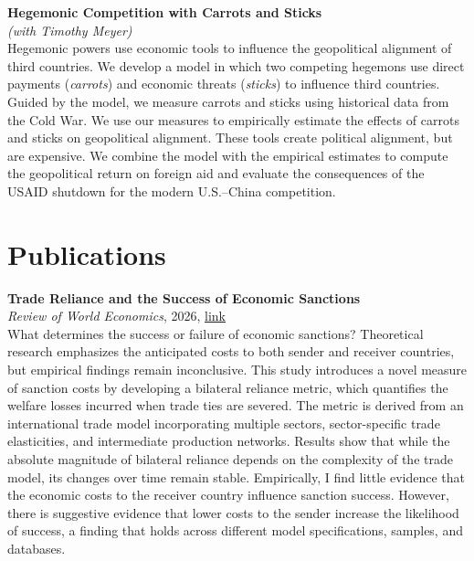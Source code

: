 \documentclass[11pt]{article}
\begin{document}
\bigskip
\noindent
\textbf{Hegemonic Competition with Carrots and Sticks} \\
\emph{(with Timothy Meyer)} \\
{\small Hegemonic powers use economic tools to influence the geopolitical alignment of third countries. We develop a model in which two competing hegemons use direct payments (\emph{carrots}) and economic threats (\emph{sticks}) to influence third countries. Guided by the model, we measure carrots and sticks using historical data from the Cold War. We use our measures to empirically estimate the effects of carrots and sticks on geopolitical alignment. These tools create political alignment, but are expensive. We combine the model with the empirical estimates to compute the geopolitical return on foreign aid and evaluate the consequences of the USAID shutdown for the modern U.S.--China competition.}

\section*{Publications}
\textbf{Trade Reliance and the Success of Economic Sanctions}  \\
\emph{Review of World Economics}, 2026, \href{https://doi.org/10.1007/s10290-026-00659-y}{link} \\
{\small What determines the success or failure of economic sanctions? Theoretical research emphasizes the anticipated costs to both sender and receiver countries, but empirical findings remain inconclusive. This study introduces a novel measure of sanction costs by developing a bilateral reliance metric, which quantifies the welfare losses incurred when trade ties are severed. The metric is derived from an international trade model incorporating multiple sectors, sector-specific trade elasticities, and intermediate production networks. Results show that while the absolute magnitude of bilateral reliance depends on the complexity of the trade model, its changes over time remain stable. Empirically, I find little evidence that the economic costs to the receiver country influence sanction success. However, there is suggestive evidence that lower costs to the sender increase the likelihood of success, a finding that holds across different model specifications, samples, and databases.}
\end{document}
